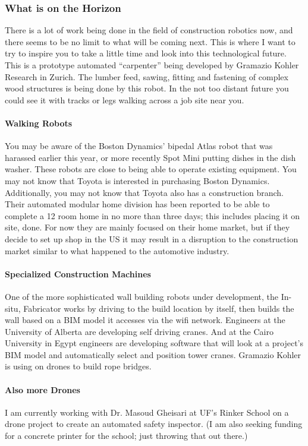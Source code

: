 \documentclass[12pt]{article}
\begin{document}
\subsubsection{What is on the Horizon}
There is a lot of work being done in the field of construction robotics now, and there seems to be no limit to what will be coming next.  This is where I want to try to inspire you to take a little time and look into this technological future.  This is a prototype automated ``carpenter'' being developed by Gramazio Kohler Research in Zurich.  The lumber feed, sawing, fitting and fastening of complex wood structures is being done by this robot.  In the not too distant future you could see it with tracks or legs walking across a job site near you.
\paragraph{Walking Robots}
You may be aware of the Boston Dynamics' bipedal Atlas robot that was harassed earlier this year, or more recently Spot Mini putting dishes in the dish washer.  These robots are close to being able to operate existing equipment.  You may not know that Toyota is interested in purchasing Boston Dynamics.  Additionally, you may not know that Toyota also has a construction branch.  Their automated  modular home division has been reported to be able to complete a 12 room home in no more than three days; this includes placing it on site, done.  For now they are mainly focused on their home market, but if they decide to set up shop in the US it may result in a disruption to the construction market similar to what happened to the automotive industry.
\paragraph{Specialized Construction Machines}
One of the more sophisticated wall building robots under development, the In-situ, Fabricator works by driving to the build location by itself, then builds the wall based on a BIM model it accesses via the wifi network.  Engineers at the University of Alberta are developing self driving cranes.  And at the Cairo University in Egypt engineers are developing software that will look at a project's BIM model and automatically select and position tower cranes.  Gramazio Kohler is using on drones to build rope bridges.
\paragraph{Also more Drones}
I am currently working with Dr. Masoud Gheisari at UF's Rinker School on a drone project to create an automated safety inspector.  (I am also seeking funding for a concrete printer for the school; just throwing that out there.)
\end{document}
